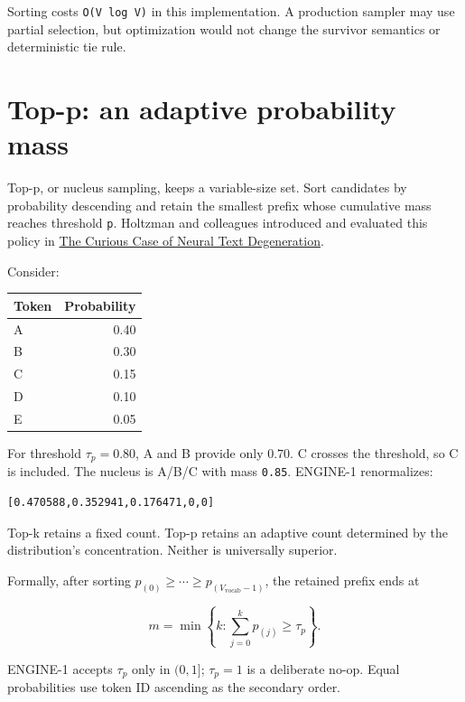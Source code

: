 Sorting costs \texttt{O(V\ log\ V)} in this implementation. A production
sampler may use partial selection, but optimization would not change the
survivor semantics or deterministic tie rule.

\section{Top-p: an adaptive probability
mass}\label{top-p-an-adaptive-probability-mass}

Top-p, or nucleus sampling, keeps a variable-size set. Sort candidates
by probability descending and retain the smallest prefix whose
cumulative mass reaches threshold \texttt{p}. Holtzman and colleagues
introduced and evaluated this policy in
\href{https://arxiv.org/abs/1904.09751}{The Curious Case of Neural Text
Degeneration}.

Consider:

{\def\LTcaptype{none} %
\begin{longtable}[]{@{}lr@{}}
\toprule\noalign{}
Token & Probability \\
\midrule\noalign{}
\endhead
\bottomrule\noalign{}
\endlastfoot
A & 0.40 \\
B & 0.30 \\
C & 0.15 \\
D & 0.10 \\
E & 0.05 \\
\end{longtable}
}

For threshold \(\tau_p=0.80\), A and B provide only \(0.70\). C crosses
the threshold, so C is included. The nucleus is A/B/C with mass
\texttt{0.85}. ENGINE-1 renormalizes:

\begin{verbatim}
[0.470588,0.352941,0.176471,0,0]
\end{verbatim}

Top-k retains a fixed count. Top-p retains an adaptive count determined
by the distribution's concentration. Neither is universally superior.

Formally, after sorting
\(p_{(0)}\ge\cdots\ge p_{(V_{\mathrm{vocab}}-1)}\), the retained prefix
ends at

\begin{equation}
m=\min\left\{k:\sum_{j=0}^{k}p_{(j)}\ge\tau_p\right\}.
\end{equation}

ENGINE-1 accepts \(\tau_p\) only in \((0,1]\); \(\tau_p=1\) is a
deliberate no-op. Equal probabilities use token ID ascending as the
secondary order.

